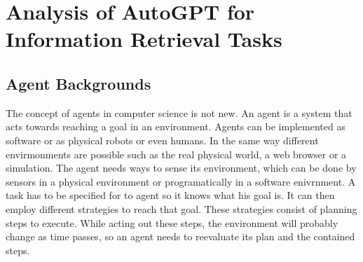 \documentclass[english, version-2022-01]{uzl-thesis}
\begin{document}





\chapter{Analysis of AutoGPT for Information Retrieval Tasks}


\section{Agent Backgrounds}

The concept of agents in computer science is not new. An agent is a system that acts towards reaching a goal in an environment. Agents can be implemented as software or as physical robots or even humans. In the same way different envirmonments are possible such as the real physical world, a web browser or a simulation. The agent needs ways to sense its environment, which can be done by sensors in a physical environment or programatically in a software enivrnment. A task has to be specified for to agent so it knows what his goal is. It can then employ different strategies to reach that goal. These strategies consist of planning steps to execute. While acting out these steps, the environment will probably change as time passes, so an agent needs to reevaluate its plan and the contained steps.
\end{document}
